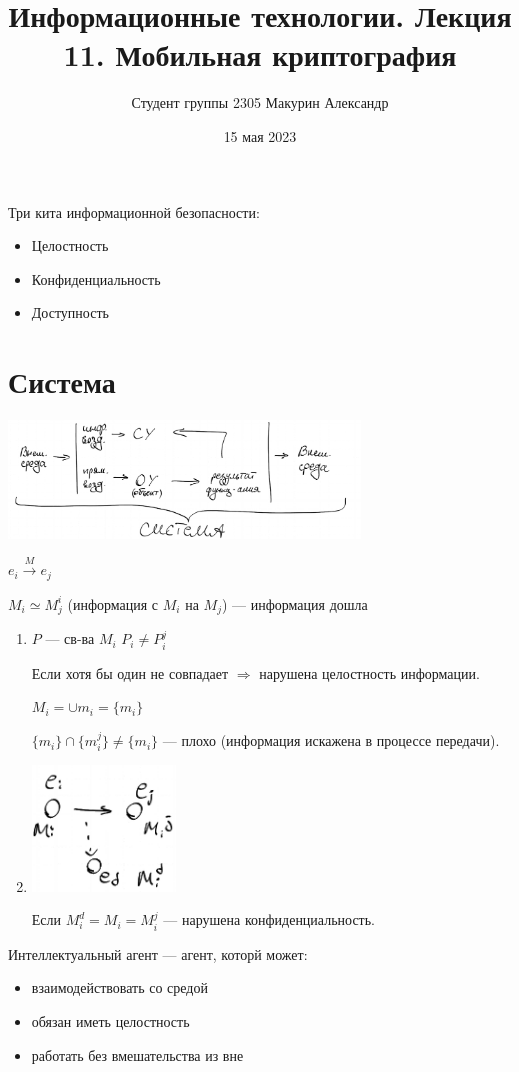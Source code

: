 \documentclass{article}
\title{Информационные технологии. Лекция 11. Мобильная криптография}
\author{Студент группы 2305 Макурин Александр}
\date{15 мая 2023}
\begin{document}
\maketitle
Три кита информационной безопасности:
\begin{itemize}
    \item Целостность
    \item Конфиденциальность
    \item Доступность
\end{itemize}

\section*{Система}
\includegraphics[width=0.7\textwidth]{graphics/pic01.png}

$e_i \xrightarrow{M} e_j$

$M_i \simeq M_j^i$ (информация с $M_i$ на $M_j$) — информация дошла

\begin{enumerate}
    \item $P$ — св-ва $M_i$
          $P_i \neq P_i^j$

          Если хотя бы один не совпадает $\Rightarrow$ нарушена целостность информации.

          $M_i = \cup m_i = \{m_i\}$

          $\{m_i\} \cap \{m_i^j\} \neq \{m_i\}$ — плохо (информация искажена в процессе передачи).
    \item \includegraphics[width=0.3\textwidth]{graphics/pic02.png}

          Если $M^d_i = M_i = M_i^j$ — нарушена конфиденциальность.
\end{enumerate}

Интеллектуальный агент — агент, которй может:
\begin{itemize}
    \item взаимодействовать со средой
    \item обязан иметь целостность
    \item работать без вмешательства из вне
\end{itemize}
\end{document}
